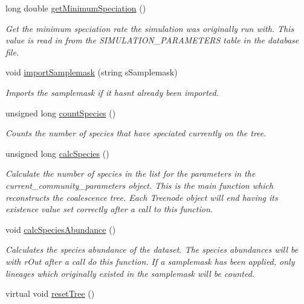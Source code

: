 \begin{DoxyCompactItemize}
long double \hyperlink{class_community_a4e5dea65183810c3b27441736eca825a}{get\+Minimum\+Speciation} ()
\begin{DoxyCompactList}\small\item\em Get the minimum speciation rate the simulation was originally run with. This value is read in from the S\+I\+M\+U\+L\+A\+T\+I\+O\+N\+\_\+\+P\+A\+R\+A\+M\+E\+T\+E\+RS table in the database file. \end{DoxyCompactList}\item 
void \hyperlink{class_community_a01a137383e1e23f2191d63f16513a00a}{import\+Samplemask} (string s\+Samplemask)
\begin{DoxyCompactList}\small\item\em Imports the samplemask if it hasn\textquotesingle{}t already been imported. \end{DoxyCompactList}\item 
unsigned long \hyperlink{class_community_a07970398c04e7c31ceda695c2860e20f}{count\+Species} ()
\begin{DoxyCompactList}\small\item\em Counts the number of species that have speciated currently on the tree. \end{DoxyCompactList}\item 
unsigned long \hyperlink{class_community_a241f69d1f69e61fc53c112fd874bf3ba}{calc\+Species} ()
\begin{DoxyCompactList}\small\item\em Calculate the number of species in the list for the parameters in the current\+\_\+community\+\_\+parameters object. This is the main function which reconstructs the coalescence tree. Each Treenode object will end having its existence value set correctly after a call to this function. \end{DoxyCompactList}\item 
void \hyperlink{class_community_a502a409a75567d78575625346b6a969f}{calc\+Species\+Abundance} ()\hypertarget{class_community_a502a409a75567d78575625346b6a969f}{}\label{class_community_a502a409a75567d78575625346b6a969f}

\begin{DoxyCompactList}\small\item\em Calculates the species abundance of the dataset. The species abundances will be with r\+Out after a call do this function. If a samplemask has been applied, only lineages which originally existed in the samplemask will be counted. \end{DoxyCompactList}\item 
virtual void \hyperlink{class_community_abd099aacb5332a9b89b3421e01269d24}{reset\+Tree} ()\hypertarget{class_community_abd099aacb5332a9b89b3421e01269d24}{}\label{class_community_abd099aacb5332a9b89b3421e01269d24}


\end{DoxyCompactItemize}
